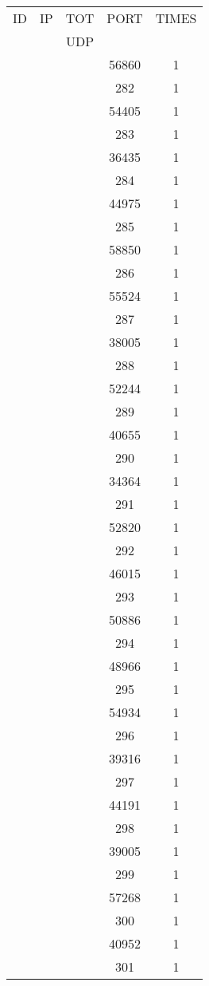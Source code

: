 \documentclass[a4paper]{scrartcl}
\begin{document}
\begin{minipage}[b]{0.5\linewidth}
\begin{tabular}{| c | c | c | c | c |}
\hline
ID & IP & TOT & PORT & TIMES \\ 
   &    & UDP &      &       \\ 
\hline
& & & 56860 & 1 \\ & & & 282 & 1 \\ & & & 54405 & 1 \\ & & & 283 & 1 \\ & & & 36435 & 1 \\ & & & 284 & 1 \\ & & & 44975 & 1 \\ & & & 285 & 1 \\ & & & 58850 & 1 \\ & & & 286 & 1 \\ & & & 55524 & 1 \\ & & & 287 & 1 \\ & & & 38005 & 1 \\ & & & 288 & 1 \\ & & & 52244 & 1 \\ & & & 289 & 1 \\ & & & 40655 & 1 \\ & & & 290 & 1 \\ & & & 34364 & 1 \\ & & & 291 & 1 \\ & & & 52820 & 1 \\ & & & 292 & 1 \\ & & & 46015 & 1 \\ & & & 293 & 1 \\ & & & 50886 & 1 \\ & & & 294 & 1 \\ & & & 48966 & 1 \\ & & & 295 & 1 \\ & & & 54934 & 1 \\ & & & 296 & 1 \\ & & & 39316 & 1 \\ & & & 297 & 1 \\ & & & 44191 & 1 \\ & & & 298 & 1 \\ & & & 39005 & 1 \\ & & & 299 & 1 \\ & & & 57268 & 1 \\ & & & 300 & 1 \\ & & & 40952 & 1 \\ & & & 301 & 1 \\ \hline\end{tabular}\end{minipage} \hfill\begin{minipage}[b]{0.5\linewidth}\begin{tabular}{| c | c | c | c | c |}

\end{tabular}
\end{minipage}
\end{document}
